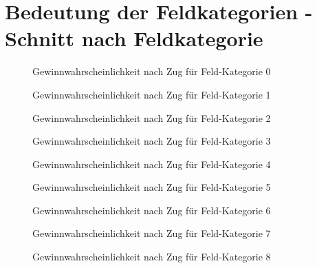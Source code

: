 \chapter{Bedeutung der Feldkategorien - Schnitt nach Feldkategorie}
\label{Anhang:Abb1}
\begin{figure}[ht]
\centering
{}
\caption{Gewinnwahrscheinlichkeit nach Zug für Feld-Kategorie 0}
\label{fig:win-pro-fc-0}
\end{figure}
\begin{figure}[ht]
\centering
{}
\caption{Gewinnwahrscheinlichkeit nach Zug für Feld-Kategorie 1}
\label{fig:win-pro-fc-1}
\end{figure}
\begin{figure}[ht]
\centering
{}
\caption{Gewinnwahrscheinlichkeit nach Zug für Feld-Kategorie 2}
\label{fig:win-pro-fc-2}
\end{figure}
\begin{figure}[ht]
\centering
{}
\caption{Gewinnwahrscheinlichkeit nach Zug für Feld-Kategorie 3}
\label{fig:win-pro-fc-3}
\end{figure}
\begin{figure}[ht]
\centering
{}
\caption{Gewinnwahrscheinlichkeit nach Zug für Feld-Kategorie 4}
\label{fig:win-pro-fc-4}
\end{figure}
\begin{figure}[ht]
\centering
{}
\caption{Gewinnwahrscheinlichkeit nach Zug für Feld-Kategorie 5}
\label{fig:win-pro-fc-5}
\end{figure}
\begin{figure}[ht]
\centering
{}
\caption{Gewinnwahrscheinlichkeit nach Zug für Feld-Kategorie 6}
\label{fig:win-pro-fc-6}
\end{figure}
\begin{figure}[ht]
\centering
{}
\caption{Gewinnwahrscheinlichkeit nach Zug für Feld-Kategorie 7}
\label{fig:win-pro-fc-7}
\end{figure}
\begin{figure}[ht]
\centering
{}
\caption{Gewinnwahrscheinlichkeit nach Zug für Feld-Kategorie 8}
\label{fig:win-pro-fc-8}
\end{figure}


